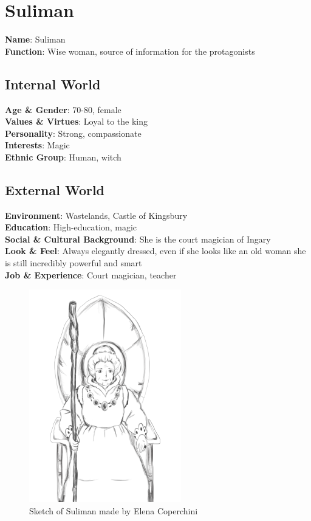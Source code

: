 \section{Suliman}

\begin{minipage}{0.5\textwidth}
\textbf{Name}: Suliman\\
\textbf{Function}: Wise woman, source of information for the protagonists

\subsection{Internal World}

\textbf{Age \& Gender}: 70-80, female \\
\textbf{Values \& Virtues}: Loyal to the king \\
\textbf{Personality}: Strong, compassionate\\
\textbf{Interests}: Magic \\
\textbf{Ethnic Group}: Human, witch

\subsection{External World}
\textbf{Environment}: Wastelands, Castle of Kingsbury \\
\textbf{Education}: High-education, magic \\
\textbf{Social \& Cultural Background}: She is the court magician of Ingary \\
\textbf{Look \& Feel}: Always elegantly dressed, even if she looks like an old woman she is still incredibly powerful and smart \\
\textbf{Job \& Experience}: Court magician, teacher \\

\end{minipage}%
%
\hfill\begin{minipage}{0.4\textwidth}
  \begin{figure}[H]
  \includegraphics{Images/Characters/suliman_portrait}
  \caption{Sketch of Suliman made by Elena Coperchini}
\end{figure}
\end{minipage}

